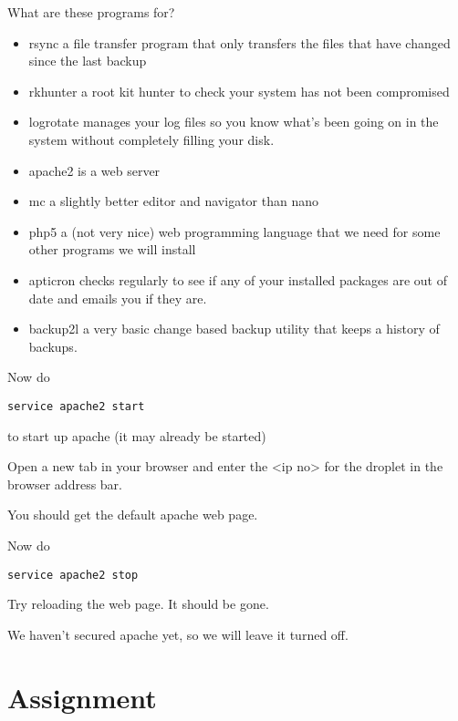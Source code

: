 \documentclass[12pt, a4paper]{article}
\begin{document}
What are these programs for?
\begin{itemize}
 \item{rsync} a file transfer program that only transfers the files that have changed  since the last backup
 \item rkhunter a root kit hunter to check your system has not been compromised

 \item logrotate manages your log files so you know what’s been going on in the system without completely filling your disk.
 \item apache2 is a web server   
 \item mc a slightly better editor and navigator than nano
 \item php5 a (not very nice) web programming language that we need for some other programs we will install
 \item apticron checks regularly to see if any of your installed packages are out of date and emails you if they are.

 \item backup2l a very basic change based backup utility that keeps a history of backups.
 


\end{itemize}



Now do 

\begin{verbatim}
service apache2 start
\end{verbatim}

to start up apache (it may already be started)

Open a new tab in your browser and enter the <ip no> for the droplet in the browser address bar.

You should get the default apache web page.

Now do

\begin{verbatim}
service apache2 stop
\end{verbatim}

Try reloading the web page. It should be gone.

We haven’t secured apache yet, so we will leave it turned off.


\section*{Assignment}
\end{document}
